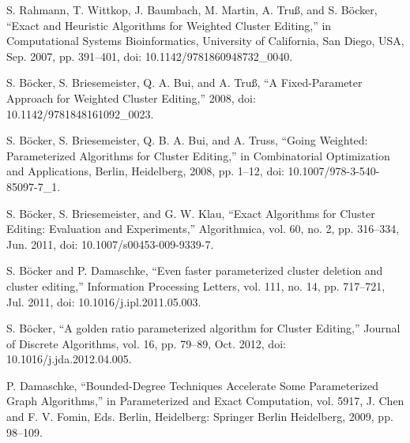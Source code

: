 \documentclass{article}
\begin{document}
\begin{thebibliography}{99}
S. Rahmann, T. Wittkop, J. Baumbach, M. Martin, A. Truß, and S. Böcker, “Exact and Heuristic
Algorithms for Weighted Cluster Editing,” in Computational Systems Bioinformatics, University of
California, San Diego, USA, Sep. 2007, pp. 391–401, doi: 10.1142/9781860948732\_0040.

S. Böcker, S. Briesemeister, Q. A. Bui, and A. Truß, “A Fixed-Parameter Approach for Weighted
Cluster Editing,” 2008, doi: 10.1142/9781848161092\_0023.

S. Böcker, S. Briesemeister, Q. B. A. Bui, and A. Truss, “Going Weighted: Parameterized
Algorithms for Cluster Editing,” in Combinatorial Optimization and Applications, Berlin, Heidelberg,
2008, pp. 1–12, doi: 10.1007/978-3-540-85097-7\_1.

S. Böcker, S. Briesemeister, and G. W. Klau, “Exact Algorithms for Cluster Editing: Evaluation
and Experiments,” Algorithmica, vol. 60, no. 2, pp. 316–334, Jun. 2011, doi:
10.1007/s00453-009-9339-7.

S. Böcker and P. Damaschke, “Even faster parameterized cluster deletion and cluster editing,”
Information Processing Letters, vol. 111, no. 14, pp. 717–721, Jul. 2011, doi:
10.1016/j.ipl.2011.05.003.

S. Böcker, “A golden ratio parameterized algorithm for Cluster Editing,” Journal of Discrete
Algorithms, vol. 16, pp. 79–89, Oct. 2012, doi: 10.1016/j.jda.2012.04.005.

P. Damaschke, “Bounded-Degree Techniques Accelerate Some Parameterized Graph Algorithms,” in
Parameterized and Exact Computation, vol. 5917, J. Chen and F. V. Fomin, Eds. Berlin, Heidelberg:
Springer Berlin Heidelberg, 2009, pp. 98–109.


\end{thebibliography}
\end{document}
